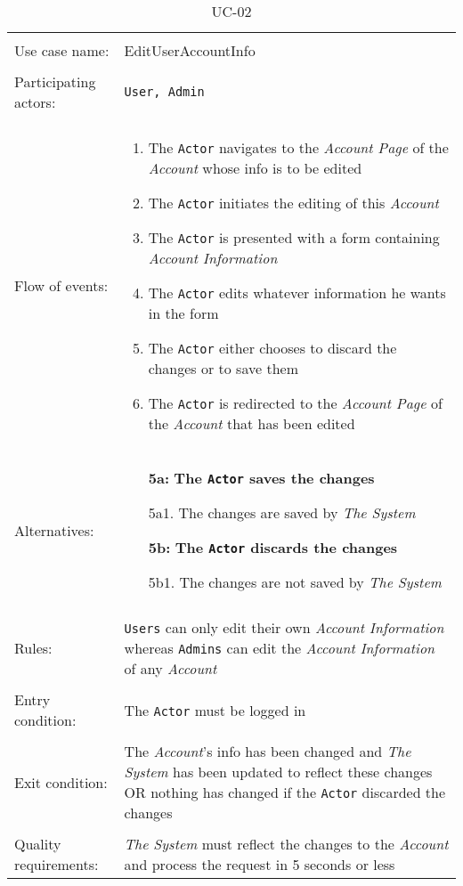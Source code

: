 \noindent
\begin{table}[h!]
\caption{UC-02}
\label{UC-02}
\centering
\begin{tabular}{ l  p{8cm} } 
\hline 
\\
Use case name:  & EditUserAccountInfo   \\   \hline    
\\            
Participating actors:  & \texttt{User, \texttt{Admin}} \\   \hline   
\\      
Flow of events: & \begin{enumerate}
\item{The \texttt{Actor} navigates to the \textit{Account Page} of the \textit{Account} whose info is to be edited}
\item{The \texttt{Actor} initiates the editing of this \textit{Account}}
\item{The \texttt{Actor} is presented with a form containing \textit{Account Information}}
\item{The \texttt{Actor} edits whatever information he wants in the form}
\item{The \texttt{Actor} either chooses to discard the changes or to save them}
\item{The \texttt{Actor} is redirected to the \textit{Account Page} of the \textit{Account} that has been edited}
\end{enumerate}
\\
Alternatives: & \begin{itemize}
\item[\textbf{5a:}]{\textbf{The \texttt{Actor} saves the changes}}
\item[]  5a1. The changes are saved by \textit{The System}
\item[\textbf{5b:}]\textbf{The \texttt{Actor} discards the changes}
\item[]  5b1. The changes are not saved by \textit{The System}
\end{itemize}
\\ \hline
\\
Rules: & \texttt{Users} can only edit their own \textit{Account Information} whereas \texttt{Admins} can edit the \textit{Account Information} of any  \textit{Account}
\\   \hline 
\\
Entry condition: & The \texttt{Actor} must be logged in \\ \hline
\\
Exit condition: & The \textit{Account}'s info has been changed and \textit{The System} has been updated to reflect these changes OR
nothing has changed if the \texttt{Actor} discarded the changes\\ \hline
\\
Quality requirements: & \textit{The System} must reflect the changes to the \textit{Account} and process the request in 5 seconds or less \\ \hline  
\end{tabular}
\end{table}

